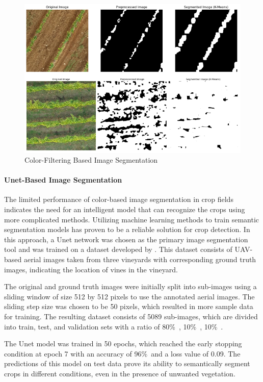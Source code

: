 \documentclass[conference]{IEEEtran}
\begin{document}
\begin{figure}[htbp]
\centering
\includegraphics[width=\linewidth]{kmeans_predictions.png}
\caption{Color-Filtering Based Image Segmentation
\cite{b5}}
\label{fig2:kmeans}
\end{figure}


\paragraph{Unet-Based Image Segmentation}
The limited performance of color-based image segmentation in crop fields indicates the need for an intelligent model that can recognize the crops using more complicated methods. Utilizing machine learning methods to train semantic segmentation models has proven to be a reliable solution for crop detection. In this approach, a Unet network was chosen as the primary image segmentation tool and was trained on a dataset developed by
\cite{b5}
. This dataset consists of UAV-based aerial images taken from three vineyards with corresponding ground truth images, indicating the location of vines in the vineyard.

The original and ground truth images were initially split into sub-images using a sliding window of size 512 by 512 pixels to use the annotated aerial images. The sliding step size was chosen to be 50 pixels, which resulted in more sample data for training. The resulting dataset consists of 5089 sub-images, which are divided into train, test, and validation sets with a ratio of 80\%\
, 10\%\
, 10\%\
.

The Unet model was trained in 50 epochs, which reached the early stopping condition at epoch 7 with an accuracy of 96\%\ and a loss value of 0.09. The predictions of this model on test data prove its ability to semantically segment crops in different conditions, even in the presence of unwanted vegetation.
\end{document}
